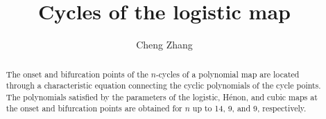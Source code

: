 \documentclass[twocolumn]{revtex4-1}
\begin{document}
\newcommand{\odd}{\mathrm{odd}}

\newcommand{\vct}[1]{\mathbf{#1}}




\newcommand{\vx}{\vct x}
\newcommand{\Tr}{\mathrm{Tr}}
\newcommand{\Pset}{\mathcal P}
\newcommand{\NB}{N_\Pset}
\newcommand{\Rlam}{(R, \lambda)}

\newcommand{\eq}{Eq.}
\newcommand{\eqs}{Eqs.}
\newcommand{\req}[1]{(\ref{eq:#1})}
\newcommand{\refeq}[1]{\eq\,\req{#1}}
\newcommand{\refeqs}[1]{\eqs\,\req{#1}}
\newcommand{\reqsub}[2]{(\ref{eq:#1}#2)}
\newcommand{\refeqsub}[2]{\eq\,\reqsub{#1}{#2}}
\newcommand{\refeqssub}[2]{\eqs\,\reqsub{#1}{#2}}

\newcommand{\refthm}[1]{Theorem \ref{thm:#1}}
\newcommand{\refthms}[1]{Theorems \ref{thm:#1}}
\newcommand{\refsec}[1]{Section \ref{sec:#1}}
\newcommand{\refsecs}[1]{Sections \ref{sec:#1}}
\newcommand{\refapd}[1]{Appendix \ref{apd:#1}}
\newcommand{\reftab}[1]{Table \ref{tab:#1}}
\newcommand{\reftabs}[1]{Tables \ref{tab:#1}}
\newcommand{\reffig}[1]{Fig. \ref{fig:#1}}
\newcommand{\reffigs}[1]{Figs. \ref{fig:#1}}

\newtheorem{theorem}{Theorem}
\newenvironment{remark}[1][1]%
{\par\noindent\textbf{Remark #1.} }{\medskip}






\title{Cycles of the logistic map}
\author{Cheng Zhang}

\begin{abstract}
%
The onset and bifurcation points of the $n$-cycles of
  a polynomial map are located
  through a characteristic equation
  connecting the cyclic polynomials of the cycle points.
The polynomials satisfied by the parameters
  of the logistic, H\'enon, and cubic maps
  at the onset and bifurcation points are obtained
  for $n$ up to 14, 9, and 9,
  respectively.
%
\end{abstract}
\maketitle
\end{document}
